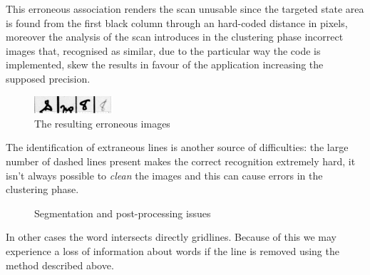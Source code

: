 This erroneous association renders the scan unusable since the targeted state area is found from the first black column through an hard-coded distance in pixels, moreover the analysis of the scan introduces in the clustering phase incorrect images that, recognised as similar, due to the particular way the code is implemented, skew the results in favour of the application increasing the supposed precision. 

\begin{figure}[!htpb]
\centering
\includegraphics[width=0.26\textwidth]{images/wrongColumn.jpg}
\caption{The resulting erroneous images}
\end{figure} 

The identification of extraneous lines is another source of difficulties: the large number of dashed lines present makes the correct recognition extremely hard, it isn't always possible to \emph{clean} the images and this can cause errors in the clustering phase.

\begin{figure}[!htpb]
 \centering
 \hspace{5mm}
 \caption{Segmentation and post-processing issues}
 \label{postProcessing}
 \end{figure}
\hspace{1mm}
In other cases the word intersects directly gridlines. Because of this we may experience a loss of information about words if the line is removed using the method described above.

